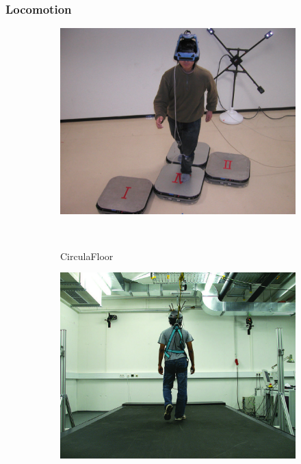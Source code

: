 \subsubsection{Locomotion}
\label{sec:locomotion}

\begin{figure}
	\centering
	\begin{subfigure}[b]{0.38\columnwidth}
		\includegraphics[width=\textwidth]{./figures/01381227}
		\caption{CirculaFloor\newline}~\label{fig:cirFloor}
	\end{subfigure}
	\begin{subfigure}[b]{0.38\columnwidth}
		\includegraphics[width=\textwidth]{./figures/ACM_TAP_2010}

\end{subfigure}
\end{figure}
